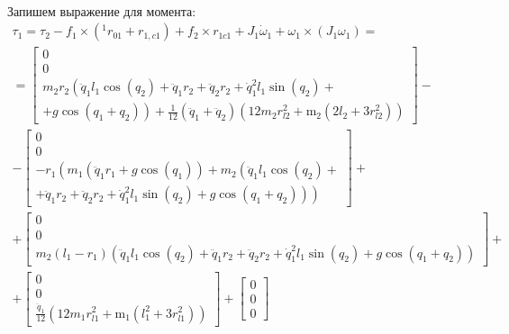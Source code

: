 \documentclass[a4paper,14pt]{extreport}
\begin{document}
\begin{itemize}
\begin{align*}
\end{align*}
Запишем выражение для момента:
\begin{eqnarray}
\tau_1 = \tau_2 - f_1 \times (^1 r_{01} + r_{1,c1}) + f_2 \times r_{1c1} + J_1 \dot \omega_1 + \omega_1 \times (J_1 \omega_1) =\nonumber\\
=
\left[\begin{matrix}0\\0\\m_{2} r_{2} \left(\ddot{q}_1 l_{1} \cos{\left (q_{2} \right )} + \ddot{q}_1 r_{2} + \ddot{q}_2 r_{2} + \dot{q}_1^{2} l_{1} \sin{\left (q_{2} \right )} \right.+\\+\left. g \cos{\left (q_{1} + q_{2} \right )}\right) + \frac{1}{12} \left(\ddot{q}_1 + \ddot{q}_2\right) \left(12 m_{2} r_{l2}^{2} + \operatorname{m_{2}}{\left (2 l_{2} + 3 r_{l2}^{2} \right )}\right)\end{matrix}\right]
-\nonumber\\
-
\left[\begin{matrix}0\\0\\
- r_{1} \left(m_{1} \left(\ddot{q}_1 r_{1} + g \cos{\left (q_{1} \right )}\right) + m_{2} \left(\ddot{q}_1 l_{1} \cos{\left (q_{2} \right )} \right.\right. +\\+\left.\left. \ddot{q}_1 r_{2} + \ddot{q}_2 r_{2} + \dot{q}_1^{2} l_{1} \sin{\left (q_{2} \right )} + g \cos{\left (q_{1} + q_{2} \right )}\right)\right)\end{matrix}\right]
+\nonumber\\
+
\left[\begin{matrix}0\\0\\m_{2} \left(l_{1} - r_{1}\right) \left(\ddot{q}_1 l_{1} \cos{\left (q_{2} \right )} + \ddot{q}_1 r_{2} + \ddot{q}_2 r_{2} + \dot{q}_1^{2} l_{1} \sin{\left (q_{2} \right )} + g \cos{\left (q_{1} + q_{2} \right )}\right)\end{matrix}\right]
+\nonumber\\
+
\left[\begin{matrix}0\\0\\\frac{\ddot{q}_1}{12} \left(12 m_{1} r_{l1}^{2} + \operatorname{m_{1}}{\left (l_{1}^{2} + 3 r_{l1}^{2} \right )}\right)\end{matrix}\right]
+
\left[\begin{matrix}0\\0\\0\end{matrix}\right]

\end{eqnarray}
\end{itemize}
\end{document}
